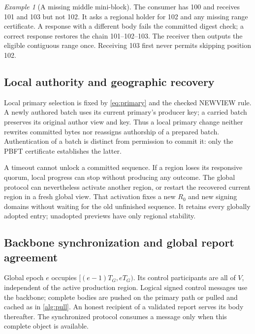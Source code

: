 \documentclass[11pt,a4paper,onecolumn]{article}
\theoremstyle{remark}\newtheorem{example}[definition]{Example}
\newcounter{protocol}
\begin{document}
\begin{example}[A missing middle mini-block]
The consumer has 100 and receives 101 and 103 but not 102. It asks a regional
holder for 102 and any missing range certificate. A response with a different
body fails the committed digest check; a correct response restores the chain
101--102--103. The receiver then outputs the eligible contiguous range once.
Receiving 103 first never permits skipping position 102.
\end{example}


\subsection{Local authority and geographic recovery}
Local primary selection is fixed by \eqref{eq:primary} and the checked
NEWVIEW rule. A newly authored batch uses its current primary's producer key;
a carried batch preserves its original author view and key. Thus a local
primary change neither rewrites committed bytes nor reassigns authorship of a
prepared batch. Authentication of a batch is distinct from permission to
commit it: only the PBFT certificate establishes the latter.

A timeout cannot unlock a committed sequence. If a region loses its responsive
quorum, local progress can stop without producing any outcome. The global
protocol can nevertheless activate another region, or restart the recovered
current region in a fresh global view. That activation fixes a new $R_0$ and
new signing domains without waiting for the old unfinished sequence. It retains
every globally adopted entry; unadopted previews have only regional stability.

\subsection{Backbone synchronization and global report agreement}\label{sec:global}
Global epoch $e$ occupies $[(e-1)T_G,eT_G)$. Its control participants are all of
$V$, independent of the active production region. Logical signed control
messages use the backbone; complete bodies are pushed on the primary path or
pulled and cached as in \cref{alg:pull}. An honest recipient of a validated
report serves its body thereafter. The synchronized protocol consumes a message
only when this complete object is available.
\end{document}
